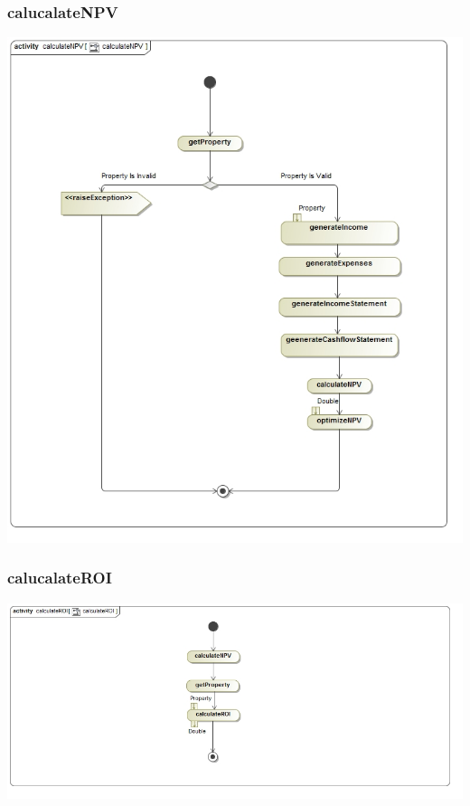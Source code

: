 \documentclass[a4paper,12pt]{article}
\begin{document}
\subsubsection{calucalateNPV}
\includegraphics[width=1\textwidth]{./Images/newDiagrams/processSpecification/Priscilla/calculateNPV.jpg}
\subsubsection{calucalateROI}
\includegraphics[width=1\textwidth]{./Images/newDiagrams/processSpecification/Priscilla/calculateROI.jpg}

\end{document}
